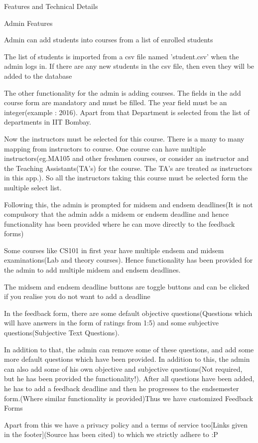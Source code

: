 \documentclass[11pt]{report}
\begin{document}
\newpage
\begin{outline}
	\item Features and Technical Details
    \begin{outline}
    	\item Admin Features
    	\begin{outline}
    	\item Admin can add students into courses from a list of enrolled students
\item The list of students is imported from a csv file named 'student.csv' when the admin logs in. If there are any new students in the csv file, then even they will be added to the database
\item The other functionality for the admin is adding courses. The fields in the add course form are mandatory and must be filled. The year field must be an integer(example : 2016). Apart from that Department is selected from the list of departments in IIT Bombay.
\item Now the instructors must be selected for this course. There is a many to many mapping from instructors to course. One course can have multiple instructors(eg.MA105 and other freshmen courses, or consider an instructor and the Teaching Assistants(TA's) for the course. The TA's are treated as instructors in this app.). So all the instructors taking this course must be selected form the multiple select list.
\item Following this, the admin is prompted for midsem and endsem deadlines(It is not compulsory that the admin adds a midsem or endsem deadline and hence functionality has been provided where he can move directly to the feedback forms)
\item Some courses like CS101 in first year have multiple endsem and midsem examinations(Lab and theory courses). Hence functionality has been provided for the admin to add multiple midsem and endsem deadlines.
\item The midsem and endsem deadline buttons are toggle buttons and can be clicked if you realise you do not want to add a deadline
\item In the feedback form, there are some default objective questions(Questions which will have answers in the form of ratings from 1:5) and some subjective questions(Subjective Text Questions). 
\item In addition to that, the admin can remove some of these questions, and add some more default questions which have been provided. In addition to this, the admin can also add some of his own objective and subjective questions(Not required, but he has been provided the functionality!). After all questions have been added, he has to add a feedback deadline and then he progresses to the endsemester form.(Where similar functionality is provided)Thus we have customized Feedback Forms
\item Apart from this we have a privacy policy and a terms of service too[Links given in the footer](Source has been cited) to which we strictly adhere to :P
\end{outline}


\end{outline}
\end{outline}
\end{document}
